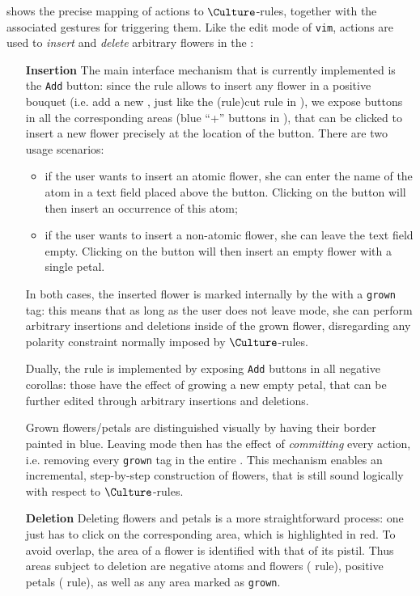  shows the precise mapping of \Edit actions to
$\Culture$-rules, together with the associated gestures for triggering them.
Like the edit mode of \texttt{vim}, \Edit actions are used to \emph{insert} and
\emph{delete} arbitrary flowers in the :
\begin{itemize}
  \item[\textbf{Insertion}] The main interface mechanism that is currently
  implemented is the \texttt{Add} button: since the  rule allows to
  insert any flower in a positive bouquet (i.e. add a new , just like the
  \kl(rule){cut} rule in ), we expose buttons in all the corresponding
  areas (blue ``+'' buttons in ), that can be
  clicked to insert a new flower precisely at the location of the button. There
  are two usage scenarios:
  \begin{itemize}
    \item if the user wants to insert an atomic flower, she can enter the name
    of the atom in a text field placed above the button. Clicking on the button
    will then insert an occurrence of this atom;
    \item if the user wants to insert a non-atomic flower, she can leave the
    text field empty. Clicking on the button will then insert an empty flower
    with a single petal.
  \end{itemize}
  In both cases, the inserted flower is marked internally by the 
  with a \texttt{grown} tag: this means that as long as the user does not leave
  \Edit mode, she can perform arbitrary insertions and deletions inside of the
  grown flower, disregarding any polarity constraint normally imposed by
  $\Culture$-rules.
  
  Dually, the  rule is implemented by exposing \texttt{Add} buttons in
  all negative corollas: those have the effect of growing a new empty petal,
  that can be further edited through arbitrary insertions and deletions.

  Grown flowers/petals are distinguished visually by having their border painted
  in blue. Leaving \Edit mode then has the effect of \emph{committing} every
  \Edit action, i.e. removing every \texttt{grown} tag in the entire . This
  mechanism enables an incremental, step-by-step construction of flowers, that
  is still sound logically with respect to $\Culture$-rules.

  \item[\textbf{Deletion}] Deleting flowers and petals is a more straightforward
  process: one just has to click on the corresponding area, which is highlighted
  in red. To avoid overlap, the area of a flower is identified with that of its
  pistil. Thus areas subject to deletion are negative atoms and flowers
  ( rule), positive petals ( rule), as well as any area
  marked as \texttt{grown}.
\end{itemize}

